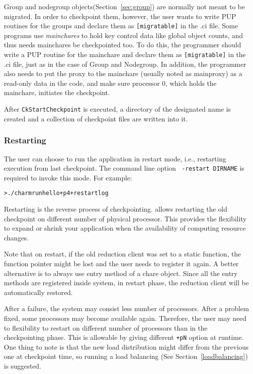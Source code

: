 Group and nodegroup objects(Section~\ref{sec:group}) are normally not 
meant to be migrated. In order to checkpoint them, however, the user 
wants to write PUP routines for the groups and declare them as 
{\tt [migratable]} in the .ci file. Some programs use {\it mainchares}
to hold key control data like global object counts, and thus needs
mainchares be checkpointed too. To do this, the programmer should write
a PUP routine for the mainchare and declare them as {\tt [migratable]} 
in the .ci file, just as in the case of Group and Nodegroup. In addition,
the programmer also needs to put the proxy to the mainchare (usually 
noted as mainproxy) as a read-only data in the code, and make sure 
processor 0, which holds the mainchare, initiates the checkpoint.

After {\tt CkStartCheckpoint} is executed, a directory of the designated
name is created and a collection of checkpoint files are written into it. 

\subsubsection{Restarting}

The user can choose to run the \charmpp{} application in restart mode, i.e.,
restarting execution from last checkpoint. The command line option {\tt
-restart DIRNAME} is required to invoke this mode. For example:

\begin{alltt}
  > ./charmrun hello +p4 +restart log
\end{alltt}

Restarting is the reverse process of checkpointing. \charmpp{} allows 
restarting the old checkpoint on different number of physical processor.
This provides the flexibility to expand or shrink your application when
the availability of computing resource changes. 

Note that on restart, if the old reduction client was set to a static 
function, the function pointer might be lost and the user needs to register
it again. A better alternative is to always use entry method of a chare
object. Since all the entry methods are registered inside \charmpp{} system,
in restart phase, the reduction client will be automatically restored.

After a failure, the system may consist less number of processors. After
a problem fixed, some processors may become available again. Therefore,
the user may need to flexibility to restart on different number of processors
than in the checkpointing phase. This is allowable by giving different 
{\tt +pN} option at runtime. One thing to note is that the new load 
distribution might differ from the previous one at checkpoint time,
so running a load balancing (See Section~\ref{loadbalancing}) is suggested. 

